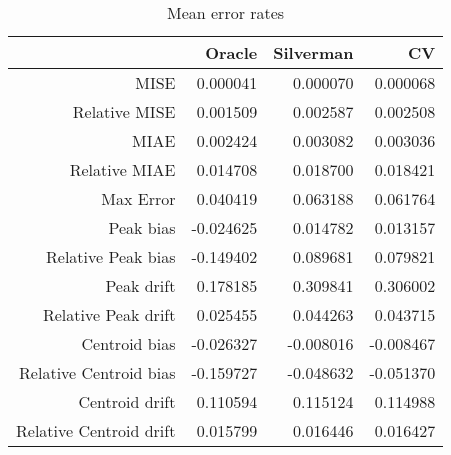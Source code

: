 \begin{table}[ht]
\centering
\begin{tabular}{rrrr}
  \hline
 & Oracle & Silverman & CV \\ 
  \hline
MISE & 0.000041 & 0.000070 & 0.000068 \\ 
  Relative MISE & 0.001509 & 0.002587 & 0.002508 \\ 
  MIAE & 0.002424 & 0.003082 & 0.003036 \\ 
  Relative MIAE & 0.014708 & 0.018700 & 0.018421 \\ 
  Max Error & 0.040419 & 0.063188 & 0.061764 \\ 
  Peak bias & -0.024625 & 0.014782 & 0.013157 \\ 
  Relative Peak bias & -0.149402 & 0.089681 & 0.079821 \\ 
  Peak drift & 0.178185 & 0.309841 & 0.306002 \\ 
  Relative Peak drift & 0.025455 & 0.044263 & 0.043715 \\ 
  Centroid bias & -0.026327 & -0.008016 & -0.008467 \\ 
  Relative Centroid bias & -0.159727 & -0.048632 & -0.051370 \\ 
  Centroid drift & 0.110594 & 0.115124 & 0.114988 \\ 
  Relative Centroid drift & 0.015799 & 0.016446 & 0.016427 \\ 
   \hline
\end{tabular}
\caption{Mean error rates} 
\label{tbl:mean_error_rates}
\end{table}
